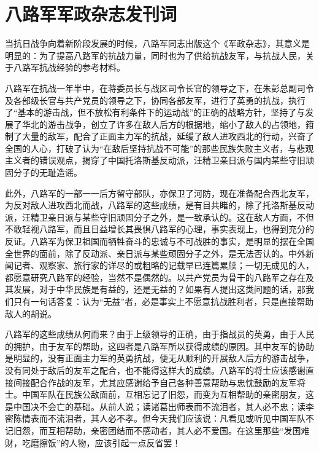 \section[八路军军政杂志发刊词（一九三九年一月二日）]{八路军军政杂志发刊词}


当抗日战争向着新阶段发展的时候，八路军同志出版这个《军政杂志》，其意义是明显的：为了提高八路军的抗战力量，同时也为了供给抗战友军，与抗战人民，关于八路军抗战经验的参考材料。

八路军在抗战一年半中，在蒋委员长与战区司令长官的领导之下，在朱彭总副司令及各部级长官与共产党员的领导之下，协同各部友军，进行了英勇的抗战，执行了“基本的游击战，但不放松有利条件下的运动战”的正确的战略方针，坚持了与发展了华北的游击战争，创立了许多在敌人后方的根据地，缩小了敌人的占领地，箝制了大量的敌军，配合了正面主力军的抗战，延缓了敌人进攻西北的行动，兴奋了全国的人心，打破了认为“在敌后坚持抗战不可能”的那些民族失败主义者，与悲观主义者的错误观点，揭穿了中国托洛斯基反动派，汪精卫亲日派与国内某些守旧顽固分子的无耻造谣。

此外，八路军的一部一一后方留守部队，亦保卫了河防，现在准备配合西北友军，为反对敌人进攻西北而战，八路军的这些成绩，是有目共睹的，除了托洛斯基反动派，汪精卫亲日派与某些守旧顽固分子之外，是一致承认的。这在敌人方面，不但不敢轻视八路军，而且日益增长其畏惧八路军的心理，事实表现上，也得到充分的反证。八路军为保卫祖国而牺牲奋斗的忠诚与不可战胜的事实，是明显的摆在全国全世界的面前，除了反动派、亲日派与某些顽固分子之外，是无法否认的。中外新闻记者、观察家、旅行家的详尽的或粗略的记载早已连篇累牍；一切无成见的人，都愿意研究八路军的经验，当然不是偶然的。以共产党员为骨干的八路军之存在及其发展，对于中华民族是有益的，还是无益的？如果有人提出这类问题的话，那我们只有一句话答复：认为“无益”者，必是事实上不愿意抗战胜利者，只是直接帮助敌人的胡说。

八路军的这些成绩从何而来？由于上级领导的正确，由于指战员的英勇，由于人民的拥护，由于友军的帮助，这四者是八路军所以获得成绩的原因。其中友军的协助是明显的，没有正面主力军的英勇抗战，便无从顺利的开展敌人后方的游击战争，没有同处于敌后的友军之配合，也不能得这样大的成绩。八路军的将士应该感谢直接间接配合作战的友军，尤其应感谢给予自己各种善意帮助与忠忱鼓励的友军将士。中国军队在民族公敌面前，互相忘记了旧怨，而变为互相帮助的亲密朋友，这是中国决不会亡的基础。从前人说；读诸葛出师表而不流泪者，其人必不忠；读李密陈情表而不流泪者，其人必不孝。但今天我们应该说：凡看见或听见中国军队不记旧怨，而互相帮助，亲密团结而不感动者，其人必不爱国。在这里那些“发国难财，吃磨擦饭”的人物，应该引起一点反省罢！

